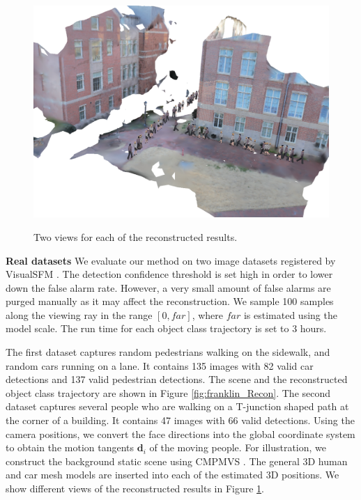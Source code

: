 \begin{figure}
{    \includegraphics[height=0.21\textheight]{chapter4/resource/tjunction2.PNG}
}
\caption{Two views for each of the reconstructed results.}
\label{fig:reconstructed}
\end{figure}
\textbf{Real datasets} We evaluate our method on two image datasets  registered by VisualSFM \cite{WuVSFM}. The detection confidence threshold  is set high in order to lower down the false alarm rate. However, a very small amount of false alarms are purged manually as it may affect the reconstruction.  We sample 100 samples along the viewing ray in the range $[0,far]$, where $far$ is  estimated using the model scale. The run time for each object class trajectory is set to 3 hours.

The first dataset captures random pedestrians walking on the sidewalk, and random cars running on a lane. It contains 135 images with 82 valid car detections and 137 valid pedestrian detections. The scene and the reconstructed object class trajectory are shown in Figure \ref{fig:franklin_Recon}. %
The second dataset captures several people who are walking on a T-junction shaped path at the corner of a building. It contains 47 images with 66 valid detections. Using the camera positions, we convert the face directions into the global coordinate system to obtain the motion tangents $\mathbf d_i$ of the moving people. For illustration, we construct the background static scene using CMPMVS \cite{JAN}. The general 3D human and car mesh models are inserted into each of the estimated 3D positions. We show different views of the reconstructed results in Figure \ref{fig:reconstructed}.

